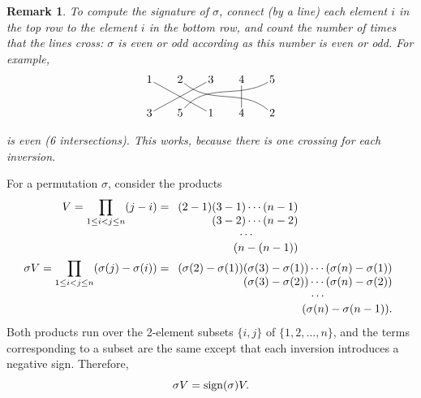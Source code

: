 \documentclass[a4paper,11pt,final]{memoir}%
\newtheorem{remark}[X]{Remark}
\theoremstyle{nonumberplain}
\begin{document}
\begin{remark}
\noindent\label{ga20r}To compute the signature of $\sigma$, connect (by a
line) each element $i$ in the top row to the element $i$ in the bottom row,
and count the number of times that the lines cross: $\sigma$ is even or odd
according as this number is even or odd. For example,
\[
\begin{tikzpicture}[inner sep=1pt]
\matrix(m)[matrix of math nodes, row sep=2em, column sep=2em,
text height=1.5ex, text depth=0.25ex]
{1&2&3&4&5\\
3&5&1&4&2\\};
\path[-]
(m-1-1) edge (m-2-3)
(m-1-2) edge[out=320,in=140] (m-2-5)
(m-1-3) edge (m-2-1)
(m-1-4) edge (m-2-4)
(m-1-5) edge[out=210,in=50] (m-2-2);
\end{tikzpicture}
\]
is even (6 intersections). This works, because there is one crossing for each inversion.
\end{remark}

For a permutation $\sigma$, consider the products
\begin{align*}
V=\prod_{1\leq i<j\leq n}(j-i)  &  =%
\begin{array}
[t]{r}%
(2-1)(3-1)\cdots(n-1)\\
(3-2)\cdots(n-2)\\
\cdots\qquad\qquad\\
(n-(n-1))
\end{array}
\\
\sigma V=\prod_{1\leq i<j\leq n}(\sigma(j)-\sigma(i))  &  =%
\begin{array}
[t]{r}%
(\sigma(2)-\sigma(1))(\sigma(3)-\sigma(1))\cdots(\sigma(n)-\sigma(1))\\
(\sigma(3)-\sigma(2))\cdots(\sigma(n)-\sigma(2))\\
\cdots\qquad\qquad\qquad\\
(\sigma(n)-\sigma(n-1)).
\end{array}
\end{align*}
Both products run over the 2-element subsets $\{i,j\}$ of $\{1,2,\ldots,n\}$,
and the terms corresponding to a subset are the same except that each
inversion introduces a negative sign. Therefore,%
\[
\sigma V=\operatorname{sign}(\sigma)V.
\]
\end{document}
